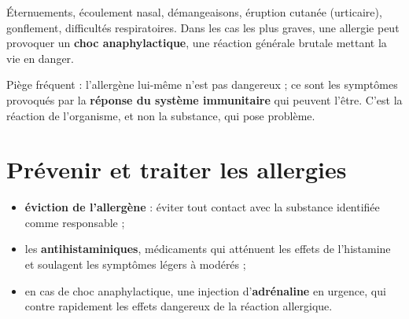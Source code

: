 \begin{illus}
\end{illus}

\begin{propriete}
Éternuements, écoulement nasal, démangeaisons, éruption cutanée (urticaire),
gonflement, difficultés respiratoires. Dans les cas les plus graves, une allergie peut
provoquer un \textbf{choc anaphylactique}, une réaction générale brutale mettant la
vie en danger.
\end{propriete}

\begin{remarque}
Piège fréquent : l'allergène lui-même n'est pas dangereux ; ce sont les symptômes
provoqués par la \textbf{réponse du système immunitaire} qui peuvent l'être. C'est la
réaction de l'organisme, et non la substance, qui pose problème.
\end{remarque}

\section{Prévenir et traiter les allergies}

\begin{propriete}
\begin{itemize}
\item \textbf{éviction de l'allergène} : éviter tout contact avec la substance
identifiée comme responsable ;
\item les \textbf{antihistaminiques}, médicaments qui atténuent les effets de
l'histamine et soulagent les symptômes légers à modérés ;
\item en cas de choc anaphylactique, une injection d'\textbf{adrénaline} en urgence,
qui contre rapidement les effets dangereux de la réaction allergique.
\end{itemize}
\end{propriete}

